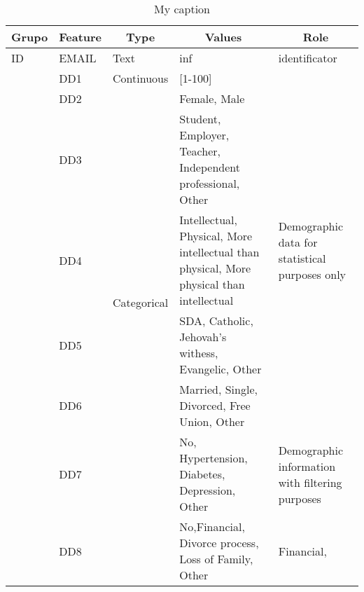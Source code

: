 \documentclass[10pt,letterpaper]{article}
\begin{document}
\begin{table}[]
	\centering
	\caption{My caption}
	\label{my-label}
	\begin{tabular}{|l|l|l|p{5cm}|p{4cm}|}
		\hline
		\multicolumn{1}{|c|}{\textbf{Grupo}} & \multicolumn{1}{c|}{\textbf{Feature}} & \multicolumn{1}{c|}{\textbf{Type}} & \multicolumn{1}{c|}{\textbf{Values}}                                                     & \multicolumn{1}{c|}{\textbf{Role}}                              \\ \hline
		ID                                   & EMAIL                                 & Text                               & inf                                                                                      & identificator                                                   \\ \hline
		\multirow{8}{*}{}         & DD1                                   & Continuous                         & {[}1-100{]}                                                                              & \multirow{6}{4cm}{Demographic data for statistical purposes only} \\ \cline{2-4}
		& DD2                                   & \multirow{6}{*}{Categorical}       & Female, Male                                                                             &                                                                 \\ \cline{2-2} \cline{4-4} 
		& DD3                                   &                                    & Student, Employer, Teacher, Independent professional, Other                              &                                                                 \\ \cline{2-2} \cline{4-4}
		& DD4                                   &                                    & Intellectual, Physical, More intellectual than physical, More physical than intellectual &                                                                 \\ \cline{2-2} \cline{4-4} {Demographic}
		& DD5                                   &                                    & SDA, Catholic, Jehovah's withess, Evangelic, Other                                       &                                       \\ \cline{2-2} \cline{4-4} 
		& DD6                                   &                                    & Married, Single, Divorced, Free Union, Other                                             &                                                                 \\ \cline{2-2} \cline{4-5} 
		& DD7                                   &                                    & No, Hypertension, Diabetes, Depression, Other                                            & Demographic information with filtering purposes                 \\ \cline{2-5} 
		& DD8                                   &                                    & No,Financial, Divorce process, Loss of Family, Other                                     & Financial,                                                      \\ \hline
	\end{tabular}
\end{table}
\end{document}
